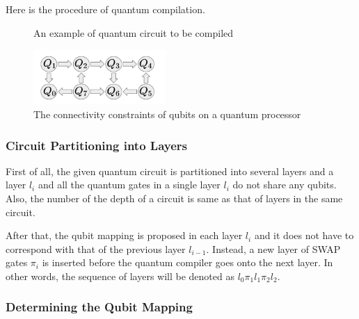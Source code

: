  Here is the procedure of quantum compilation.   
  \begin{figure}[ht]
  	\begin{center}

		\caption{An example of quantum circuit to be compiled}
	\end{center}
\end{figure}

  \begin{figure}[ht]
  	\begin{center}
  		\includegraphics[width=5cm]{img/quantum-processor.png}
		\caption{The connectivity constraints of qubits on a quantum processor}
	\end{center}
\end{figure}
	
 
\subsubsection{Circuit Partitioning into Layers}

 First of all, the given quantum circuit is partitioned into several layers and a layer $l_i$ and all the quantum gates in a single layer $l_i$ do not share any qubits. Also, the number of the depth of a circuit is same as that of layers in the same circuit.
 
 After that, the qubit mapping is proposed in each layer $l_i$ and it does not have to correspond with that of the previous layer  $l_{i-1}$. Instead, a new layer of SWAP gates $\pi_i$ is inserted before the quantum compiler goes onto the next layer. In other words, the sequence of layers will be denoted as $l_0 \pi_1 l_1\pi_2 l_2$.
 
\subsubsection{Determining the Qubit Mapping}

